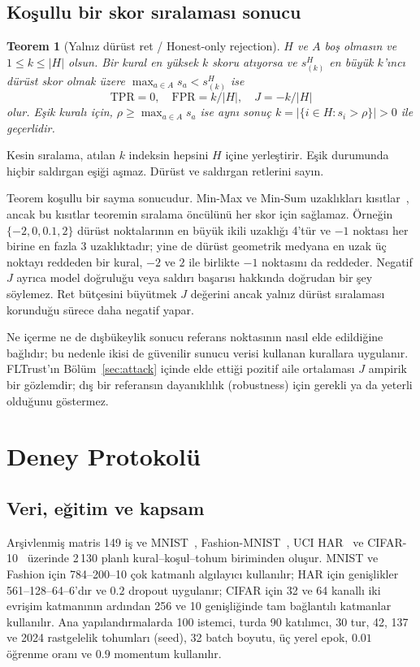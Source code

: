 \documentclass[journal]{IEEEtran}
\newtheorem{theorem}{Teorem}
\begin{document}
\subsection{Koşullu bir skor sıralaması sonucu}
\begin{theorem}[Yalnız dürüst ret / Honest-only rejection]\label{thm:inversion}
$H$ ve $A$ boş olmasın ve $1\leq k\leq|H|$ olsun. Bir kural en yüksek $k$ skoru atıyorsa ve $s^H_{(k)}$ en büyük $k$'ıncı dürüst skor olmak üzere $\max_{a\in A}s_a<s^H_{(k)}$ ise
\[
\mathrm{TPR}=0,\quad\mathrm{FPR}=k/|H|,\quad J=-k/|H|
\]
olur. Eşik kuralı için, $\rho\geq\max_{a\in A}s_a$ ise aynı sonuç $k=|\{i\in H:s_i>\rho\}|>0$ ile geçerlidir.
\end{theorem}
\begin{IEEEproof}
Kesin sıralama, atılan $k$ indeksin hepsini $H$ içine yerleştirir. Eşik durumunda hiçbir saldırgan eşiği aşmaz. Dürüst ve saldırgan retlerini sayın.
\end{IEEEproof}
Teorem koşullu bir sayma sonucudur. Min-Max ve Min-Sum uzaklıkları kısıtlar~\cite{shejwalkar2021}, ancak bu kısıtlar teoremin sıralama öncülünü her skor için sağlamaz. Örneğin $\{-2,0,0.1,2\}$ dürüst noktalarının en büyük ikili uzaklığı 4'tür ve $-1$ noktası her birine en fazla 3 uzaklıktadır; yine de dürüst geometrik medyana en uzak üç noktayı reddeden bir kural, $-2$ ve $2$ ile birlikte $-1$ noktasını da reddeder. Negatif $J$ ayrıca model doğruluğu veya saldırı başarısı hakkında doğrudan bir şey söylemez. Ret bütçesini büyütmek $J$ değerini ancak yalnız dürüst sıralaması korunduğu sürece daha negatif yapar.

Ne içerme ne de dışbükeylik sonucu referans noktasının nasıl elde edildiğine bağlıdır; bu nedenle ikisi de güvenilir sunucu verisi kullanan kurallara uygulanır. FLTrust'ın Bölüm~\ref{sec:attack} içinde elde ettiği pozitif aile ortalaması $J$ ampirik bir gözlemdir; dış bir referansın dayanıklılık (robustness) için gerekli ya da yeterli olduğunu göstermez.

\section{Deney Protokolü}\label{sec:protocol}


\subsection{Veri, eğitim ve kapsam}
Arşivlenmiş matris 149 iş ve MNIST~\cite{lecun1998}, Fashion-MNIST~\cite{xiao2017fmnist}, UCI HAR~\cite{anguita2013har} ve CIFAR-10~\cite{krizhevsky2009} üzerinde 2\,130 planlı kural--koşul--tohum biriminden oluşur. MNIST ve Fashion için 784--200--10 çok katmanlı algılayıcı kullanılır; HAR için genişlikler 561--128--64--6'dır ve $0.2$ dropout uygulanır; CIFAR için 32 ve 64 kanallı iki evrişim katmanının ardından 256 ve 10 genişliğinde tam bağlantılı katmanlar kullanılır. Ana yapılandırmalarda 100 istemci, turda 90 katılımcı, 30 tur, 42, 137 ve 2024 rastgelelik tohumları (seed), 32 batch boyutu, üç yerel epok, $0.01$ öğrenme oranı ve $0.9$ momentum kullanılır.
\end{document}
